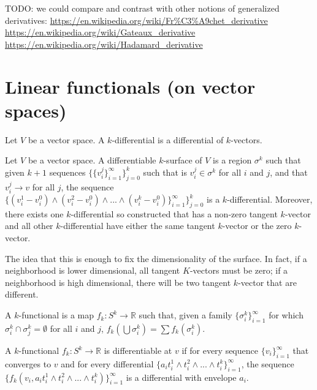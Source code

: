 \documentclass[11pt,letterpaper,fleqn]{memoir}
\begin{document}
\begin{remark}
	TODO: we could compare and contrast with other notions of generalized derivatives: \url{https://en.wikipedia.org/wiki/Fr%C3%A9chet_derivative} \url{https://en.wikipedia.org/wiki/Gateaux_derivative} \url{https://en.wikipedia.org/wiki/Hadamard_derivative}
\end{remark}

\section{Linear functionals (on vector spaces)}

\begin{defn}
	Let $V$ be a vector space. A $k$-differential is a differential of  $k$-vectors.
\end{defn}

\begin{defn}
	Let $V$ be a vector space. A differentiable $k$-surface of $V$ is a region $\sigma^k$ such that given $k+1$ sequences $\{ \{ {v}^j_i \}_{i=1}^{\infty}\}_{j=0}^{k}$ such that is ${v}^j_i \in \sigma^k$ for all $i$ and $j$, and that ${v}^j_i \to v$ for all $j$, the sequence $\{ ({v}^1_i - {v}^0_i) \wedge ({v}^2_i - {v}^0_i) \wedge ... \wedge ({v}^k_i - {v}^0_i) \}_{i=1}^{\infty}\}_{j=0}^{k}$ is a $k$-differential. Moreover, there exists one $k$-differential so constructed that has a non-zero tangent $k$-vector and all other $k$-differential have either the same tangent $k$-vector or the zero $k$-vector.
\end{defn}

\begin{remark}
	The idea that this is enough to fix the dimensionality of the surface. In fact, if a neighborhood is lower dimensional, all tangent $K$-vectors must be zero; if a neighborhood is high dimensional, there will be two tangent $k$-vector that are different.
\end{remark}

\begin{defn}
	A $k$-functional is a map $f_k : S^k \to \mathbb{R}$ such that,  given a family $\{ \sigma^k_i\}_{i=1}^{\infty}$ for which $\sigma^k_i \cap \sigma^k_j = \emptyset$ for all $i$ and $j$, $f_k(\bigcup \sigma^k_i) = \sum f_k(\sigma^k_i)$.
\end{defn}

\begin{defn}
	A $k$-functional $f_k : S^k \to \mathbb{R}$ is differentiable at $v$ if for every sequence $\{v_i\}_{i=1}^{\infty}$ that converges to $v$ and for every differential $\{a_i {t}^1_i \wedge {t}^2_i \wedge ... \wedge {t}^k_i \}_{i=1}^{\infty}$, the sequence $\{f_k(v_i, a_i {t}^1_i \wedge {t}^2_i \wedge ... \wedge {t}^k_i) \}_{i=1}^{\infty}$ is a differential with envelope $a_i$.
\end{defn}
\end{document}
